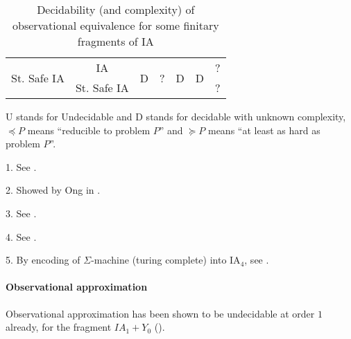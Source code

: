 \begin{table}
\begin{tabular}{|c|c||c|c|c|c|c|}
  \multirow{4}{*}{St. Safe IA} & \multirow{2}{*}{IA}           & \multirow{4}{*}{D} & \multirow{4}{*}{?} & \multirow{4}{*}{D} & \multirow{4}{*}{D} & \multirow{2}{*}{?} \\
                               &                               &                    &                    &                    &                    & \\
\cline{2-2} \cline{7-7}        &  \multirow{2}{*}{St. Safe IA} &                    &                    &                    &                    & \multirow{2}{*}{?} \\
                               &                               &                    &                    &                    &                    & \\ \hline
\end{tabular}
\caption{Decidability (and complexity) of observational equivalence for some finitary fragments of IA}

U stands for Undecidable and D stands for decidable with unknown complexity, $\preccurlyeq P$ means ``reducible to problem $P$''
and $\succcurlyeq P$ means ``at least as hard as problem $P$''.
\begin{asparaenum}
\item[1.] See \cite{ghicamccusker00}.
\item[2.] Showed by Ong in \cite{OngLics2006}.
\item[3.] See \cite{DBLP:conf/fossacs/MurawskiW05}.
\item[4.] See \cite{DBLP:conf/icalp/MurawskiOW05}.
\item[5.] By encoding of $\Sigma$-machine (turing complete) into IA$_4$, see \cite{murawski03program}.

\end{asparaenum}
\end{table}

\paragraph{Observational approximation}

Observational approximation has been shown to be undecidable at order $1$ already, for the fragment $IA_1 + Y_0$ (\cite{DBLP:conf/fossacs/MurawskiW05}).





